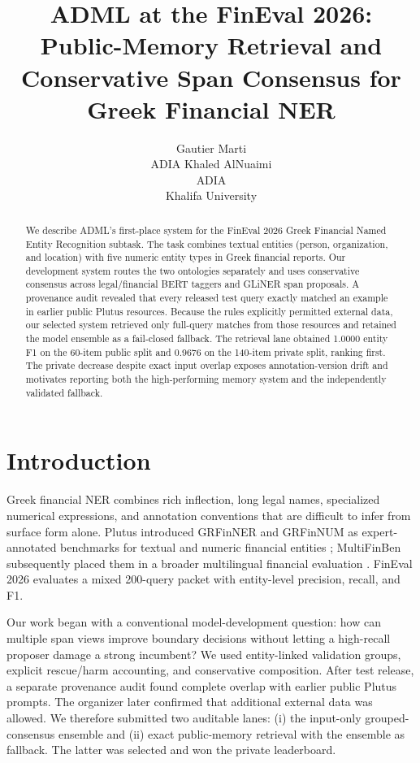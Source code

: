 \documentclass[11pt]{article}
\title{ADML at the FinEval 2026: Public-Memory Retrieval and Conservative Span Consensus for Greek Financial NER}
\author{Gautier Marti \\
  ADIA
  \And
  Khaled AlNuaimi \\
  ADIA \\
  Khalifa University}
\begin{document}
\maketitle

\begin{abstract}
We describe ADML's first-place system for the FinEval 2026 Greek Financial Named Entity Recognition subtask. The task combines textual entities (person, organization, and location) with five numeric entity types in Greek financial reports. Our development system routes the two ontologies separately and uses conservative consensus across legal/financial BERT taggers and GLiNER span proposals. A provenance audit revealed that every released test query exactly matched an example in earlier public Plutus resources. Because the rules explicitly permitted external data, our selected system retrieved only full-query matches from those resources and retained the model ensemble as a fail-closed fallback. The retrieval lane obtained 1.0000 entity F1 on the 60-item public split and 0.9676 on the 140-item private split, ranking first. The private decrease despite exact input overlap exposes annotation-version drift and motivates reporting both the high-performing memory system and the independently validated fallback.
\end{abstract}

\section{Introduction}
Greek financial NER combines rich inflection, long legal names, specialized numerical expressions, and annotation conventions that are difficult to infer from surface form alone. Plutus introduced GRFinNER and GRFinNUM as expert-annotated benchmarks for textual and numeric financial entities \citep{peng-etal-2025-plutus}; MultiFinBen subsequently placed them in a broader multilingual financial evaluation \citep{peng-etal-2026-multifinben}. FinEval 2026 evaluates a mixed 200-query packet with entity-level precision, recall, and F1.

Our work began with a conventional model-development question: how can multiple span views improve boundary decisions without letting a high-recall proposer damage a strong incumbent? We used entity-linked validation groups, explicit rescue/harm accounting, and conservative composition. After test release, a separate provenance audit found complete overlap with earlier public Plutus prompts. The organizer later confirmed that additional external data was allowed. We therefore submitted two auditable lanes: (i) the input-only grouped-consensus ensemble and (ii) exact public-memory retrieval with the ensemble as fallback. The latter was selected and won the private leaderboard.
\end{document}
